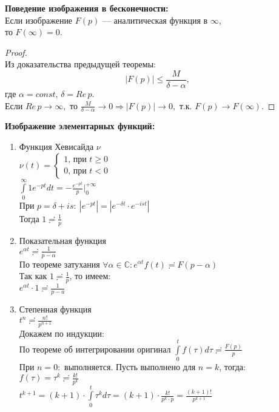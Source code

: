 \textbf{Поведение изображения в бесконечности:}\\[2mm]
Если изображение $F(p)$ --- аналитическая функция в $\infty$,\\
то $F(\infty)=0$.
\begin{proof}
    \ \\
    Из доказательства предыдущей теоремы:
    $$|F(p)|\leq \frac{M}{\delta - \alpha},$$ где $\alpha=const, \, \delta=Re\,p$.\\
    Если $Re\,p\to\infty,$ то $\frac{M}{\delta-\alpha}\to 0 \Rightarrow |F(p)|\to 0,$ т.к. $F(p)\to F(\infty)$.
\end{proof}

\textbf{Изображение элементарных функций:}
\begin{enumerate}
    \item Функция Хевисайда $\nu$\\
    $\nu(t)=
    \begin{cases}
        1\text{, при }t\geq 0\\
        0\text{, при }t< 0
    \end{cases}$\\
    $\int\limits_{0}^{\infty}1e^{-pt}dt=-\frac{e^{-pt}}{p}\bigg|_0^{+\infty}$\\
    При $p=\delta +i s: \ |e^{-pt}|=|e^{-\delta t}\cdot e^{-i s t}|$\\
    Тогда $1\risingdotseq \frac{1}{p}$

    \item Показательная функция\\
    $e^{\alpha t}\risingdotseq \frac{1}{p-\alpha}$\\
    По теореме затухания $\forall \alpha \in \mathbb{C}: e^{\alpha t} f(t) \risingdotseq F(p-\alpha)$\\
    Так как $1\risingdotseq \frac{1}{p}$, то имеем:\\
    $e^{\alpha t}\cdot 1 \risingdotseq \frac{1}{p-a}$

    \item Степенная функция\\
    $t^n \risingdotseq \frac{n!}{p^{n+1}}$\\
    Докажем по индукции:\\
    По теореме об интегрировании оригинал $\int\limits_{0}^{t} f(\tau)d\tau \risingdotseq \frac{F(p)}{p}$\\
    При $n=0:$ выполняется. Пусть выполнено для $n=k$, тогда:\\
    $f(\tau)=\tau^k \risingdotseq \frac{k!}{p^k}$\\
    $t^{k+1}=(k+1)\cdot\int\limits_{0}^{t}\tau^k d\tau = (k+1)\cdot \frac{k!}{p^k \cdot p} = \frac{(k+1)!}{p^{k+1}}$\\[2mm]
\end{enumerate}

